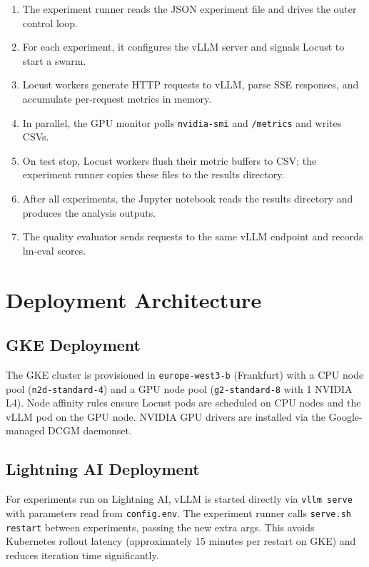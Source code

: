 \documentclass[a4paper,12pt]{report}
\begin{document}
\begin{enumerate}
    \item The experiment runner reads the JSON experiment file and drives the outer control loop.
    \item For each experiment, it configures the vLLM server and signals Locust to start a swarm.
    \item Locust workers generate HTTP requests to vLLM, parse SSE responses, and accumulate per-request metrics in memory.
    \item In parallel, the GPU monitor polls \texttt{nvidia-smi} and \texttt{/metrics} and writes CSVs.
    \item On test stop, Locust workers flush their metric buffers to CSV; the experiment runner copies these files to the results directory.
    \item After all experiments, the Jupyter notebook reads the results directory and produces the analysis outputs.
    \item The quality evaluator sends requests to the same vLLM endpoint and records lm-eval scores.
\end{enumerate}

\section{Deployment Architecture}

\subsection{GKE Deployment}

The GKE cluster is provisioned in \texttt{europe-west3-b} (Frankfurt) with a CPU node pool (\texttt{n2d-standard-4}) and a GPU node pool (\texttt{g2-standard-8} with 1 NVIDIA L4). Node affinity rules ensure Locust pods are scheduled on CPU nodes and the vLLM pod on the GPU node. NVIDIA GPU drivers are installed via the Google-managed DCGM daemonset.

\subsection{Lightning AI Deployment}

For experiments run on Lightning AI, vLLM is started directly via \texttt{vllm serve} with parameters read from \texttt{config.env}. The experiment runner calls \texttt{serve.sh restart} between experiments, passing the new extra args. This avoids Kubernetes rollout latency (approximately 15 minutes per restart on GKE) and reduces iteration time significantly.
\end{document}
